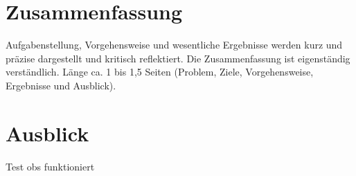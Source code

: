 
\chapter{Zusammenfassung}
Aufgabenstellung, Vorgehensweise und wesentliche Ergebnisse werden kurz und präzise dargestellt und kritisch reflektiert. Die Zusammenfassung ist eigenständig verständlich. Länge ca. 1 bis 1,5 Seiten (Problem, Ziele, Vorgehensweise, Ergebnisse und Ausblick).

\chapter{Ausblick}
Test obs funktioniert
